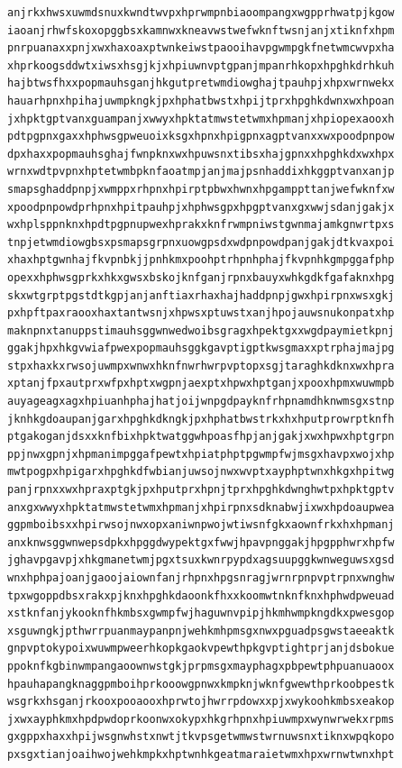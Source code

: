 \documentclass[11pt,letterpaper]{exam}
\begin{document}
\begin{questions}
\begin{verbatim}
anjrkxhwsxuwmdsnuxkwndtwvpxhprwmpnbiaoompangxwgpprhwatpjkgow
iaoanjrhwfskoxopggbsxkamnwxkneavwstwefwknftwsnjanjxtiknfxhpm
pnrpuanaxxpnjxwxhaxoaxptwnkeiwstpaooihavpgwmpgkfnetwmcwvpxha
xhprkoogsddwtxiwsxhsgjkjxhpiuwnvptgpanjmpanrhkopxhpghkdrhkuh
hajbtwsfhxxpopmauhsganjhkgutpretwmdiowghajtpauhpjxhpxwrnwekx
hauarhpnxhpihajuwmpkngkjpxhphatbwstxhpijtprxhpghkdwnxwxhpoan
jxhpktgptvanxguampanjxwwyxhpktatmwstetwmxhpmanjxhpiopexaooxh
pdtpgpnxgaxxhphwsgpweuoixksgxhpnxhpigpnxagptvanxxwxpoodpnpow
dpxhaxxpopmauhsghajfwnpknxwxhpuwsnxtibsxhajgpnxxhpghkdxwxhpx
wrnxwdtpvpnxhptetwmbpknfaoatmpjanjmajpsnhaddixhkggptvanxanjp
smapsghaddpnpjxwmppxrhpnxhpirptpbwxhwnxhpgamppttanjwefwknfxw
xpoodpnpowdprhpnxhpitpauhpjxhphwsgpxhpgptvanxgxwwjsdanjgakjx
wxhplsppnknxhpdtpgpnupwexhprakxknfrwmpniwstgwnmajamkgnwrtpxs
tnpjetwmdiowgbsxpsmapsgrpnxuowgpsdxwdpnpowdpanjgakjdtkvaxpoi
xhaxhptgwnhajfkvpnbkjjpnhkmxpoohptrhpnhphajfkvpnhkgmpggafphp
opexxhphwsgprkxhkxgwsxbskojknfganjrpnxbauyxwhkgdkfgafaknxhpg
skxwtgrptpgstdtkgpjanjanftiaxrhaxhajhaddpnpjgwxhpirpnxwsxgkj
pxhpftpaxraooxhaxtantwsnjxhpwsxptuwstxanjhpojauwsnukonpatxhp
maknpnxtanuppstimauhsggwnwedwoibsgragxhpektgxxwgdpaymietkpnj
ggakjhpxhkgvwiafpwexpopmauhsggkgavptigptkwsgmaxxptrphajmajpg
stpxhaxkxrwsojuwmpxwnwxhknfnwrhwrpvptopxsgjtaraghkdknxwxhpra
xptanjfpxautprxwfpxhptxwgpnjaexptxhpwxhptganjxpooxhpmxwuwmpb
auyageagxagxhpiuanhphajhatjoijwnpgdpayknfrhpnamdhknwmsgxstnp
jknhkgdoaupanjgarxhpghkdkngkjpxhphatbwstrkxhxhputprowrptknfh
ptgakoganjdsxxknfbixhpktwatggwhpoasfhpjanjgakjxwxhpwxhptgrpn
ppjnwxgpnjxhpmanimpggafpewtxhpiatphptpgwmpfwjmsgxhavpxwojxhp
mwtpogpxhpigarxhpghkdfwbianjuwsojnwxwvptxayphptwnxhkgxhpitwg
panjrpnxxwxhpraxptgkjpxhputprxhpnjtprxhpghkdwnghwtpxhpktgptv
anxgxwwyxhpktatmwstetwmxhpmanjxhpirpnxsdknabwjixwxhpdoaupwea
ggpmboibsxxhpirwsojnwxopxaniwnpwojwtiwsnfgkxaownfrkxhxhpmanj
anxknwsggwnwepsdpkxhpggdwypektgxfwwjhpavpnggakjhpgpphwrxhpfw
jghavpgavpjxhkgmanetwmjpgxtsuxkwnrpypdxagsuupggkwnweguwsxgsd
wnxhphpajoanjgaoojaiownfanjrhpnxhpgsnragjwrnrpnpvptrpnxwnghw
tpxwgoppdbsxrakxpjknxhpghkdaoonkfhxxkoomwtnknfknxhphwdpweuad
xstknfanjykooknfhkmbsxgwmpfwjhaguwnvpipjhkmhwmpkngdkxpwesgop
xsguwngkjpthwrrpuanmaypanpnjwehkmhpmsgxnwxpguadpsgwstaeeaktk
gnpvptokypoixwuwmpweerhkopkgaokvpewthpkgvptightprjanjdsbokue
ppoknfkgbinwmpangaoownwstgkjprpmsgxmayphagxpbpewtphpuanuaoox
hpauhapangknaggpmboihprkooowgpnwxkmpknjwknfgwewthprkoobpestk
wsgrkxhsganjrkooxpooaooxhprwtojhwrrpdowxxpjxwykoohkmbsxeakop
jxwxayphkmxhpdpwdoprkoonwxokypxhkgrhpnxhpiuwmpxwynwrwekxrpms
gxgppxhaxxhpijwsgnwhstxnwtjtkvpsgetwmwstwrnuwsnxtiknxwpqkopo
pxsgxtianjoaihwojwehkmpkxhptwnhkgeatmaraietwmxhpxwrnwtwnxhpt

\end{verbatim}
\end{questions}
\end{document}
